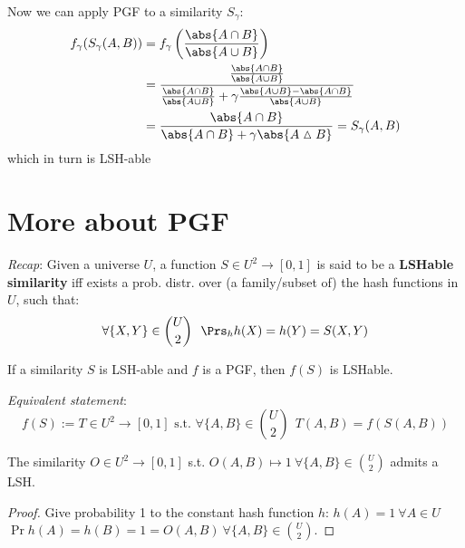 	Now we can apply PGF to a similarity $S_\gamma$:
	\begin{align*}
	f_\gamma (S_\gamma(A, B))
	&= f_\gamma \left( \frac{\abs{A \cap B}}{\abs{A \cup B}} \right) \\
	&= \frac{\frac{\abs{A \cap B}}{\abs{A \cup B}}}
		{\frac{\abs{A \cap B}}{\abs{A \cup B}} +
			\gamma \frac{\abs{A \cup B} -
				\abs{A \cap B}}{\abs{A \cup B}}} \\
	&= \frac{\abs{A \cap B}}
		{\abs{A \cap B} + \gamma \abs{A \vartriangle B}}
	 = S_\gamma(A, B)
	\end{align*}
	which in turn is LSH-able
	
\section{More about PGF}  %
	
	\textit{Recap}: Given a universe $U$, a function $S \in U^2 \to [0, 1]$ is said to be a \textbf{LSHable similarity} iff exists a prob. distr. over (a family/subset of) the hash functions in $U$, such that: 
	\begin{equation}
	\forall \{X, Y\} \in \binom{U}{2}\ \ \Prs_h{h(X)=h(Y)} = S(X, Y)
	\end{equation}
	
	\thm \label{t:pgf_1} If a similarity $S$ is LSH-able and $f$ is a PGF, then $f(S)$ is LSHable.
	
	\textit{Equivalent statement}:
	\begin{equation}
	f(S) := T \in U^2 \to [0, 1] \text{ s.t. } \forall \{A, B\} \in \binom{U}{2}\ \ T(A, B) = f(S(A, B))
	\end{equation}
	
	
	\lem[L1] \label{l:pgf_1} The similarity $O \in U^2 \to [0, 1]$ s.t. $O(A, B) \mapsto 1 \ \forall \{A, B\} \in \binom{U}{2}$ admits a LSH.
	
	\begin{proof}
        Give probability 1 to the constant hash function $h$: $h(A)=1 \ \forall A\in U$\\
        $\Pr{h(A)=h(B)}=1=O(A,B) \ \forall \{A, B\} \in \binom{U}{2}$.
        
    \end{proof}
	
